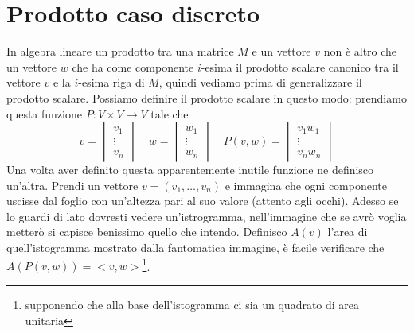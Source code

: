 \documentclass[11pt,a4paper]{report}
\theoremstyle{definition}
\theoremstyle{plain}
\theoremstyle{plain}
\begin{document}
		

		\section{Prodotto caso discreto}
		\label{sec:prod-can}
			In algebra lineare un prodotto tra una matrice $M$ e un vettore $v$ non è altro che un vettore $w$ che ha come componente $i$-esima il prodotto scalare canonico tra il vettore $v$ e la $i$-esima riga di $M$, quindi vediamo prima di generalizzare il prodotto scalare.\newline
			Possiamo definire il prodotto scalare in questo modo: prendiamo questa funzione $P:V\times V\rightarrow V$ tale che 
			\begin{equation}
				v=
				\begin{vmatrix}
					v_1\\
					\vdots \\
					v_n
				\end{vmatrix}
				\quad w=
				\begin{vmatrix}
					w_1\\
					\vdots \\
					w_n
				\end{vmatrix}
				\quad P(v,w)=
				\begin{vmatrix}
					v_1 w_1\\
					\vdots \\
					v_n w_n
				\end{vmatrix}
			\end{equation}
			Una volta aver definito questa apparentemente inutile funzione ne definisco un'altra. Prendi un vettore $v=(v_1,\dots,v_n)$ e immagina che ogni componente uscisse dal foglio con un'altezza pari al suo valore (attento agli occhi).\newline
			Adesso se lo guardi di lato dovresti vedere un'istrogramma, nell'immagine che se avrò voglia metterò si capisce benissimo quello che intendo.\newline
			Definisco $A(v)$ l'area di quell'istogramma mostrato dalla fantomatica immagine, è facile verificare che $A(P(v,w))=<v,w>$\footnote{supponendo che alla base dell'istogramma ci sia un quadrato di area unitaria}.
\end{document}
